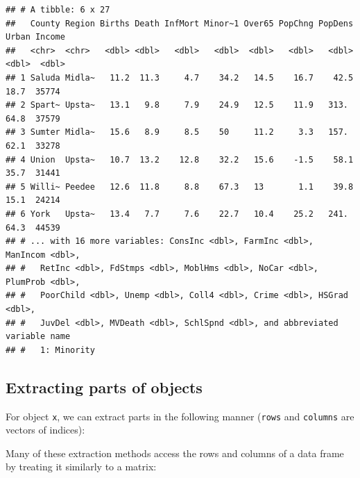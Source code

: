 \documentclass[
]{book}
\newenvironment{Shaded}{\begin{snugshade}}{\end{snugshade}}
\newcommand{\DecValTok}[1]{\textcolor[rgb]{0.00,0.00,0.81}{#1}}
\newcommand{\FunctionTok}[1]{\textcolor[rgb]{0.00,0.00,0.00}{#1}}
\newcommand{\NormalTok}[1]{#1}
\newcommand{\SpecialCharTok}[1]{\textcolor[rgb]{0.00,0.00,0.00}{#1}}
\newcommand{\StringTok}[1]{\textcolor[rgb]{0.31,0.60,0.02}{#1}}
\begin{document}
\begin{verbatim}
## # A tibble: 6 x 27
##   County Region Births Death InfMort Minor~1 Over65 PopChng PopDens Urban Income
##   <chr>  <chr>   <dbl> <dbl>   <dbl>   <dbl>  <dbl>   <dbl>   <dbl> <dbl>  <dbl>
## 1 Saluda Midla~   11.2  11.3     4.7    34.2   14.5    16.7    42.5  18.7  35774
## 2 Spart~ Upsta~   13.1   9.8     7.9    24.9   12.5    11.9   313.   64.8  37579
## 3 Sumter Midla~   15.6   8.9     8.5    50     11.2     3.3   157.   62.1  33278
## 4 Union  Upsta~   10.7  13.2    12.8    32.2   15.6    -1.5    58.1  35.7  31441
## 5 Willi~ Peedee   12.6  11.8     8.8    67.3   13       1.1    39.8  15.1  24214
## 6 York   Upsta~   13.4   7.7     7.6    22.7   10.4    25.2   241.   64.3  44539
## # ... with 16 more variables: ConsInc <dbl>, FarmInc <dbl>, ManIncom <dbl>,
## #   RetInc <dbl>, FdStmps <dbl>, MoblHms <dbl>, NoCar <dbl>, PlumProb <dbl>,
## #   PoorChild <dbl>, Unemp <dbl>, Coll4 <dbl>, Crime <dbl>, HSGrad <dbl>,
## #   JuvDel <dbl>, MVDeath <dbl>, SchlSpnd <dbl>, and abbreviated variable name
## #   1: Minority
\end{verbatim}

\hypertarget{extracting-parts-of-objects}{%
\subsection*{Extracting parts of objects}\label{extracting-parts-of-objects}}

For object \texttt{x}, we can extract parts in the following manner (\texttt{rows} and \texttt{columns} are vectors of indices):

\begin{Shaded}
\end{Shaded}

Many of these extraction methods access the rows and columns of a data frame by treating it similarly to a matrix:
\end{document}
